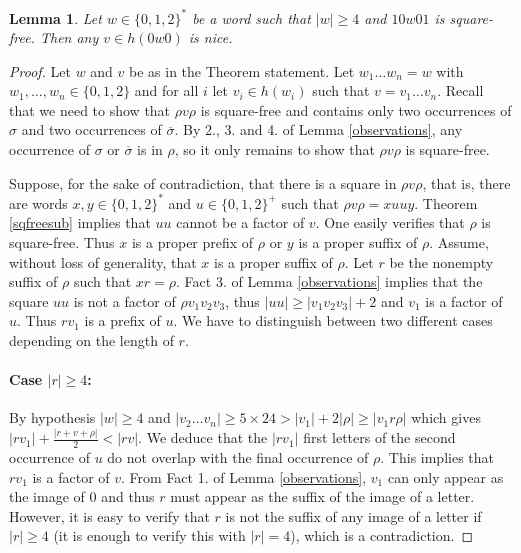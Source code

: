 \documentclass[a4paper,12pt]{article}
\newtheorem{lemma}{Lemma}
\newcommand{\pal}{\rho}
\newcommand{\hpal}{\sigma}
\begin{document}
\begin{lemma}\label{hissqfreeandpfree}
Let $w\in \{0,1,2\}^*$ be a word such that $|w|\ge4$ and  $10w01$ is square-free. Then any $v\in h(0w0)$ is nice.
\end{lemma}
\begin{proof}
Let $w$ and $v$ be as in the Theorem statement.
Let $w_1\ldots w_n=w$ with $w_1,\ldots,w_n\in \{0,1,2\}$ and for all $i$ let $v_i\in h(w_i)$ such that $v=v_1\ldots v_n$.
Recall that we need to show that $\pal v\pal$ is square-free and contains only two occurrences of $\hpal$ and two occurrences of $\overline{\hpal}$. 
By 2., 3.  and 4. of Lemma \ref{observations}, any occurrence of $\hpal$ or $\overline{\hpal}$ is in $\pal$, so it only remains to show that $\pal v\pal$ is square-free.
 
 Suppose, for the sake of contradiction, that there is a square in $\pal v\pal$, that is, there are words $x,y\in\{0,1,2\}^*$ and $u\in\{0,1,2\}^+$ such that $\pal v\pal =xuuy$. Theorem \ref{sqfreesub} implies that $uu$ cannot be a factor of $v$. One easily verifies that $\pal$ is square-free. 
 Thus $x$ is a proper prefix of $\pal$ or $y$ is a proper suffix of $\pal$. Assume, without loss of generality, that $x$ is a proper suffix of $\pal$.
 Let $r$ be the nonempty suffix of $\pal$ such that $xr=\pal$.
 Fact 3. of Lemma \ref{observations} implies that the square $uu$ is not a factor of $\pal v_1v_2v_3$, thus $|uu|\ge |v_1v_2v_3|+2$ and $v_1$ is a factor of $u$.
 Thus $rv_1$ is a prefix of $u$.  
 We have to distinguish between two different cases depending on the length of $r$.

 \paragraph{Case $|r|\ge4$:}
By hypothesis $|w|\ge4$ and $|v_2\ldots v_n|\ge 5\times24>|v_1|+2|\pal|\ge |v_1r\pal |$ which gives $|rv_1|+\frac{|r+v+\pal|}{2}<|rv|$.
We deduce that the $|rv_1|$ first letters of the second occurrence of $u$ do not overlap with the final occurrence of $\pal$. 
 This implies that $rv_1$ is a factor of $v$. 
 From Fact 1. of Lemma \ref{observations}, $v_1$ can only appear as the image of $0$ and thus $r$ must appear as the suffix of the image of a letter. 
 However, it is easy to verify that $r$ is not the suffix of any image of a letter if $|r|\ge4$ (it is enough to verify this with $|r|=4$), which is a contradiction.
 


\end{proof}
\end{document}
